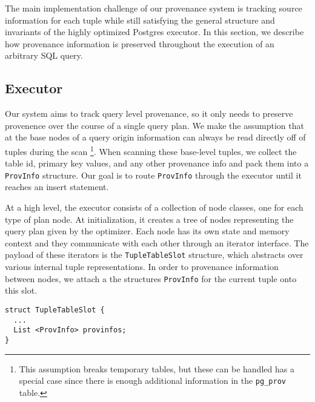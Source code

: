 
The main implementation challenge of our provenance system is tracking source information for each tuple while still satisfying the general structure and invariants of the highly optimized Postgres executor. In this section, we describe how provenance information is preserved throughout the execution of an arbitrary SQL query.

\subsection{Executor}

Our system aims to track query level provenance, so it only needs to preserve provenence over the course of a single query plan. We make the assumption that at the base nodes of a query origin information can always be read directly off of tuples during the scan \footnote{This assumption breaks temporary tables, but these can be handled has a special case since there is enough additional information in the \texttt{pg\_prov} table. }. When scanning these base-level tuples, we collect the table id, primary key values, and any other provenance info and pack them into a \texttt{ProvInfo} structure. Our goal is to route \texttt{ProvInfo} through the executor until it reaches an insert statement.

At a high level, the executor consists of a collection of node classes, one for each type of plan node. At initialization, it creates a tree of nodes representing the query plan given by the optimizer. Each node has its own state and memory context and they communicate with each other through an iterator interface. The payload of these iterators is the \texttt{TupleTableSlot} structure, which abstracts over various internal tuple representations. In order to provenance information between nodes, we attach a the structures \texttt{ProvInfo} for the current tuple onto this slot.

\begin{verbatim}
struct TupleTableSlot {
  ...
  List <ProvInfo> provinfos;
}
\end{verbatim}

